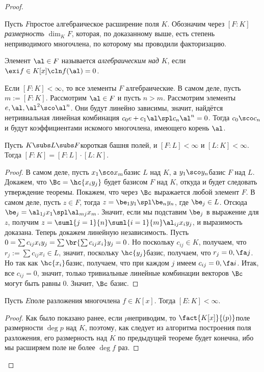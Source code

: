 \documentclass[a4paper]{article}
\begin{document}
\begin{proof}
\begin{df}
Пусть $F$\т простое алгебраическое расширение поля $K$. Обозначим через $[F:K]$ \emph{размерность} $\dim_K F$,
которая, по доказанному выше, есть степень неприводимого многочлена, по которому мы проводили факторизацию.
\end{df}

\begin{df}
Элемент $\al \in F$ называется \emph{алгебраическим над} $K$, если $\exi f \in K[x]\cln f(\al)=0$.
\end{df}

Если $[F:K] < \infty$, то все элементы $F$ алгебраические. В самом деле, пусть $m := [F:K]$. Рассмотрим $\al
\in F$ и пусть $n>m$. Рассмотрим элементы $e, \al, \al^2\sco \al^n$. Они будут линейно зависимы, значит,
найдётся нетривиальная линейная комбинация $c_0e+c_1\al \spl c_n\al^n=0$. Тогда $c_0\sco c_n$ и будут
коэффициентами искомого многочлена, имеющего корень $\al$.

\begin{theorem}
Пусть $K \subs L \subs F$\т короткая башня полей, и $[F:L]<\infty$ и $[L:K]<\infty$.  Тогда
$[F:K]=[F:L]\cdot[L:K]$.
\end{theorem}
\begin{proof}
В самом деле, пусть $x_1\sco x_m$\т базис $L$ над $K$, а $y_1\sco y_n$\т  базис $F$ над $L$. Докажем, что
$\Bc=\hc{x_iy_j}$ будет базисом $F$ над $K$, откуда и будет следовать утверждение теоремы. Покажем, что через
$\Bc$ выражается любой элемент $F$. В самом деле, пусть $z \in F$, тогда $z=\be_1y_1 \spl \be_ny_n$, где
$\be_j \in L$. Отсюда $\be_j = \al_{1j}x_1 \spl \al_{mj}x_m$. Значит, если мы подставим $\be_j$ в выражение
для $z$, получим $z = \suml{j=1}{n}\suml{i=1}{m}\al_{ij}x_iy_j$, и выразимость доказана. Теперь докажем
линейную независимость. Пусть $0=\sum c_{ij} x_iy_j=\sum\br{\sum c_{ij}x_i}y_j=0$. Но поскольку $c_{ij} \in
K$, получаем, что $r_j := \sum c_{ij}x_i \in L$, значит, поскольку $\hc{y_j}$\т базис, получаем, что $r_j =
0, \fa j$. Но так как $\hc{x_i}$\т базис, получаем, что при каждом $j$ имеем $c_{ij}=0, \fa i$. Итак, все
$c_{ij}=0$, значит, только тривиальные линейные комбинации векторов $\Bc$ могут быть равны 0. Значит, $\Bc$\т
базис.
\end{proof}

\begin{imp}
Пусть $E$\т поле разложения многочлена $f \in K[x]$. Тогда $[E:K]<\infty$.
\end{imp}
\begin{proof}
Как было показано ранее, если $p$\т неприводим, то $\fact{K[x]}{(p)}$\т поле  размерности $\deg p$ над $K$,
поэтому, как следует из алгоритма построения поля разложения, его размерность над $K$ по предыдущей теореме
будет конечна, ибо мы расширяем поле не более $\deg f$ раз.
\end{proof}


\end{proof}
\end{document}
